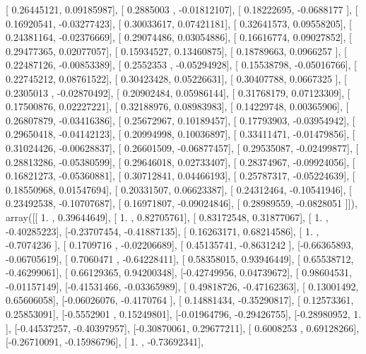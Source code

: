 \documentclass{article}
\begin{document}
       [ 0.26445121,  0.09185987],
       [ 0.2885003 , -0.01812107],
       [ 0.18222695, -0.0688177 ],
       [ 0.16920541, -0.03277423],
       [ 0.30033617,  0.07421181],
       [ 0.32641573,  0.09558205],
       [ 0.24381164, -0.02376669],
       [ 0.29074486,  0.03054886],
       [ 0.16616774,  0.09027852],
       [ 0.29477365,  0.02077057],
       [ 0.15934527,  0.13460875],
       [ 0.18789663,  0.0966257 ],
       [ 0.22487126, -0.00853389],
       [ 0.2552353 , -0.05294928],
       [ 0.15538798, -0.05016766],
       [ 0.22745212,  0.08761522],
       [ 0.30423428,  0.05226631],
       [ 0.30407788,  0.0667325 ],
       [ 0.2305013 , -0.02870492],
       [ 0.20902484,  0.05986144],
       [ 0.31768179,  0.07123309],
       [ 0.17500876,  0.02227221],
       [ 0.32188976,  0.08983983],
       [ 0.14229748,  0.00365906],
       [ 0.26807879, -0.03416386],
       [ 0.25672967,  0.10189457],
       [ 0.17793903, -0.03954942],
       [ 0.29650418, -0.04142123],
       [ 0.20994998,  0.10036897],
       [ 0.33411471, -0.01479856],
       [ 0.31024426, -0.00628837],
       [ 0.26601509, -0.06877457],
       [ 0.29535087, -0.02499877],
       [ 0.28813286, -0.05380599],
       [ 0.29646018,  0.02733407],
       [ 0.28374967, -0.09924056],
       [ 0.16821273, -0.05360881],
       [ 0.30712841,  0.04466193],
       [ 0.25787317, -0.05224639],
       [ 0.18550968,  0.01547694],
       [ 0.20331507,  0.06623387],
       [ 0.24312464, -0.10541946],
       [ 0.23492538, -0.10707687],
       [ 0.16971807, -0.09024846],
       [ 0.28989559, -0.0828051 ]]), array([[ 1.        ,  0.39644649],
       [ 1.        ,  0.82705761],
       [ 0.83172548,  0.31877067],
       [ 1.        , -0.40285223],
       [-0.23707454, -0.41887135],
       [ 0.16263171,  0.68214586],
       [ 1.        , -0.7074236 ],
       [ 0.1709716 , -0.02206689],
       [ 0.45135741, -0.8631242 ],
       [-0.66365893, -0.06705619],
       [ 0.7060471 , -0.64228411],
       [ 0.58358015,  0.93946449],
       [ 0.65538712, -0.46299061],
       [ 0.66129365,  0.94200348],
       [-0.42749956,  0.04739672],
       [ 0.98604531, -0.01157149],
       [-0.41531466, -0.03365989],
       [ 0.49818726, -0.47162363],
       [ 0.13001492,  0.65606058],
       [-0.06026076, -0.4170764 ],
       [ 0.14881434, -0.35290817],
       [ 0.12573361,  0.25853091],
       [-0.5552901 ,  0.15249801],
       [-0.01964796, -0.29426755],
       [-0.28980952,  1.        ],
       [-0.44537257, -0.40397957],
       [-0.30870061,  0.29677211],
       [ 0.6008253 ,  0.69128266],
       [-0.26710091, -0.15986796],
       [ 1.        , -0.73692341],
\end{document}
